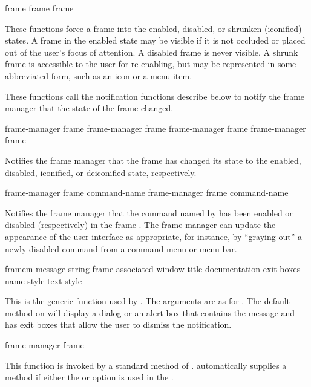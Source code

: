 { {frame}
 {frame}
 {frame}

These functions force a frame into the enabled, disabled, or shrunken
(iconified) states.  A frame in the enabled state may be visible if it is not
occluded or placed out of the user's focus of attention.  A disabled frame is
never visible.  A shrunk frame is accessible to the user for re-enabling, but
may be represented in some abbreviated form, such as an icon or a menu item.

These functions call the notification functions describe below to notify the
frame manager that the state of the frame changed.

 {frame-manager frame}
 {frame-manager frame}
 {frame-manager frame}
 {frame-manager frame}

Notifies the frame manager  that the frame  has
changed its state to the enabled, disabled, iconified, or deiconified state,
respectively.


 {frame-manager frame command-name}
 {frame-manager frame command-name}

Notifies the frame manager  that the command named by
 has been enabled or disabled (respectively) in the frame
.  The frame manager can update the appearance of the user interface
as appropriate, for instance, by ``graying out'' a newly disabled command from a
command menu or menu bar.


 {framem message-string
                                         \key frame associated-window title documentation
                                              exit-boxes name style text-style}

This is the generic function used by .  The arguments are as for
.  The default method on  will
display a dialog or an alert box that contains the message and has exit boxes
that allow the user to dismiss the notification.


 {frame-manager frame}

This function is invoked by a standard method of .
 automatically supplies a 
method if either the  or  option is used in the
.

}
